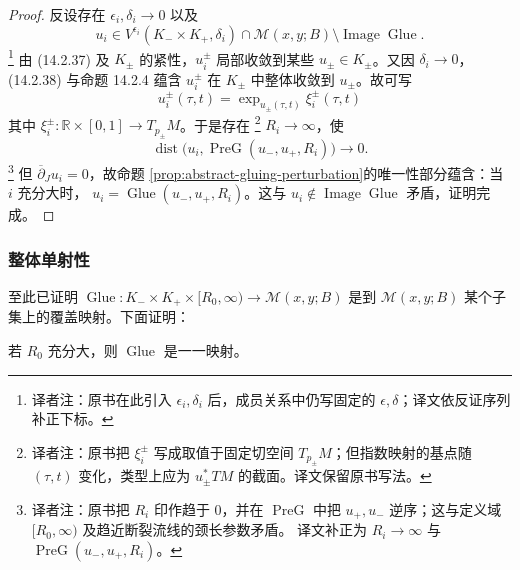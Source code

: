 \begin{proof}
反设存在 $\epsilon_i,\delta_i\to0$ 以及
\[
 u_i\in V^{\epsilon_i}(K_-\times K_+,\delta_i)
 \cap\mathcal M(x,y;B)\setminus\operatorname{Image}\operatorname{Glue}.
\]
\footnote{译者注：原书在此引入 $\epsilon_i,\delta_i$ 后，成员关系中仍写固定的
$\epsilon,\delta$；译文依反证序列补正下标。}
由 (14.2.37) 及 $K_\pm$ 的紧性，$u_i^\pm$ 局部收敛到某些
$u_\pm\in K_\pm$。又因 $\delta_i\to0$，(14.2.38) 与命题 14.2.4 蕴含
$u_i^\pm$ 在 $K_\pm$ 中整体收敛到 $u_\pm$。故可写
\[
 u_i^\pm(\tau,t)=\exp_{u_\pm(\tau,t)}\xi_i^\pm(\tau,t)
\]
其中 $\xi_i^\pm:\mathbb R\times[0,1]\to T_{p_\pm}M$。于是存在
\footnote{译者注：原书把 $\xi_i^\pm$ 写成取值于固定切空间
$T_{p_\pm}M$；但指数映射的基点随 $(\tau,t)$ 变化，类型上应为
$u_\pm^*TM$ 的截面。译文保留原书写法。}
$R_i\to\infty$，使
\[
 \operatorname{dist}\bigl(u_i,\operatorname{PreG}(u_-,u_+,R_i)\bigr)\to0.
\]
\footnote{译者注：原书把 $R_i$ 印作趋于 $0$，并在 $\operatorname{PreG}$ 中把
$u_+,u_-$ 逆序；这与定义域 $[R_0,\infty)$ 及趋近断裂流线的颈长参数矛盾。
译文补正为 $R_i\to\infty$ 与 $\operatorname{PreG}(u_-,u_+,R_i)$。}
但 $\overline\partial_Ju_i=0$，故命题
\ref{prop:abstract-gluing-perturbation}的唯一性部分蕴含：当 $i$ 充分大时，
$u_i=\operatorname{Glue}(u_-,u_+,R_i)$。这与
$u_i\notin\operatorname{Image}\operatorname{Glue}$ 矛盾，证明完成。
\end{proof}

\subsubsection*{整体单射性}
至此已证明
$\operatorname{Glue}:K_-\times K_+\times[R_0,\infty)\to\mathcal M(x,y;B)$
是到 $\mathcal M(x,y;B)$ 某个子集上的覆盖映射。下面证明：

\begin{proposition}
\label{prop:glue-global-injectivity}
若 $R_0$ 充分大，则 $\operatorname{Glue}$ 是一一映射。
\end{proposition}

